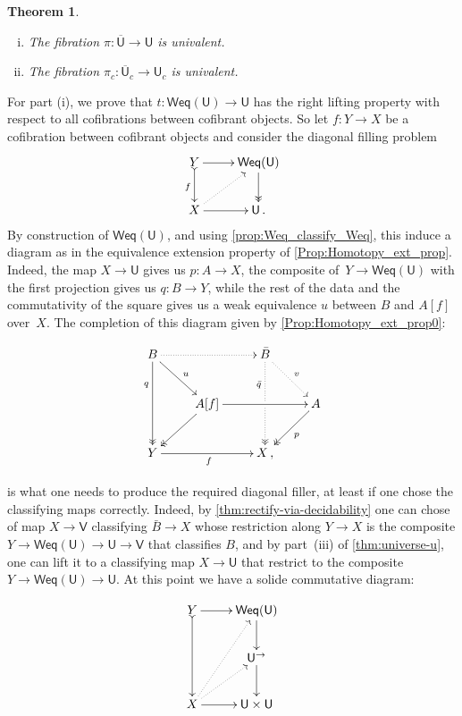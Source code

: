 \documentclass[reqno,10pt,a4paper,oneside]{amsart}
\makeatletter
\renewenvironment{proof}[1][\proofname] {\par\pushQED{\qed}\normalfont\topsep6\p@\@plus6\p@\relax\trivlist\item[\hskip\labelsep\bf#1\@addpunct{.}]\ignorespaces}{\popQED\endtrivlist\@endpefalse}
\numberwithin{equation}{section}
\theoremstyle{mythm}
\newtheorem{theorem}{Theorem}[section]
\theoremstyle{mydef}
\theoremstyle{myrmk}
\newcommand{\co}{\colon}
\newcommand{\UU}{\overline{\mathsf{U}}}
\newcommand{\U}{\mathsf{U}}
\newcommand{\V}{\mathsf{V}}
\newcommand{\Weq}{\mathsf{Weq}}
\makeatother
\begin{document}
\begin{theorem}  \label{thm:univalence-of-u-and-uc} \hfill 
\begin{enumerate}[(i)]
\item The fibration $\pi \co \UU \to \U$ is univalent.
\item The fibration $\pi_c \co \UU_c \to \U_c$ is univalent.
\end{enumerate}
\end{theorem}

\begin{proof} For part (i), we prove that $t \co  \Weq(\U) \to \U$ has the right lifting property with respect
to all cofibrations between cofibrant objects. So let $f \co Y \rightarrow X$ be a cofibration between cofibrant objects and consider the diagonal
filling problem
\[
\xymatrix{Y \ar@{>->}[d]_f \ar[r] & \Weq(\U) \ar@{->>}[d] \\
X \ar[r] \ar@{.>}[ur]  & \U \, .
}
\]
By construction of $\Weq(\U)$, and using \cref{prop:Weq_classify_Weq}, this induce a diagram as in the equivalence extension property of \cref{Prop:Homotopy_ext_prop}. Indeed, the map $X \rightarrow \U$ gives us
$p \co A \to X$, the composite of~$Y \rightarrow  \mathsf{Weq}(\U)$ with the first projection
gives us $q \co B \to Y$, while the rest of the data and the commutativity of the square 
gives us a weak equivalence $u$ between $B$ and $A[f]$ over~$X$. The completion of this diagram given by \cref{Prop:Homotopy_ext_prop0}:

\[ 
\xymatrix{
 B
  \ar@{.>}[rr]
  \ar[dr]^{u}
  \ar@{->>}[dd]_(.3){q}
&&
  \bar{B}
  \ar@{.>}[dr]^{v}
  \ar@{.>>}[dd]_(.3){\bar{q}}|{\hole}
&\\&
  A[f] 
  \ar[rr]
  \ar@{->>}[dl]
&&
  A
  \ar@{->>}[dl]^{p}
\\
  Y
  \ar[rr]_{f}
&&
  X \, ,
&
}
\]

 is what one needs to produce the required diagonal filler, at least if one chose the classifying maps correctly. Indeed, by \cref{thm:rectify-via-decidability} one can chose of map $X \to \V$ classifying $\bar{B} \to X$ whose restriction along $Y \to X$ is the composite $Y \to \Weq(\U) \to \U \to \V$ that classifies $B$, and by part~(iii) of \cref{thm:universe-u}, one can lift it to a classifying map $X \to \U$ that restrict to the composite $Y \to \Weq(\U) \to \U$. At this point we have a solide commutative diagram:

\[ \xymatrix{ Y \ar@{>->}[dd] \ar[r] & \Weq(\U) \ar[d] \\
 & \U^\to \ar[d] \\
X \ar@{.>}[ur] \ar@{.>}[uur] \ar[r] & \U \times \U 
}\]


\end{proof}
\end{document}
